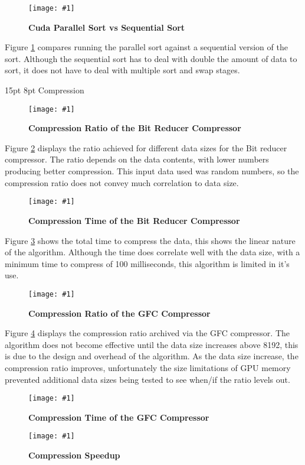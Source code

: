 \documentclass[12pt,a4paper]{article}
\makeatletter
\newcommand{\figuremacroWHHN}[3]{
	\begin{figure}[H] %
		\centering
		\texttt{[image: \#1]}
		\caption[#2]{\textbf{#2}}
		\label{fig:#1}
	\end{figure}
}
\newcommand{\figuremacroWHN}[3]{
	\begin{figure}[h!] %
		\centering
		\texttt{[image: \#1]}
		\caption[#2]{\textbf{#2}}
		\label{fig:#1}
	\end{figure}
}
\renewcommand\subsection{\@startsection {subsection}{1}{2mm} %
                               {15pt} %
                               {8pt} %
                               {\fontsize{13pt}{1em}\bfseries}}
\makeatother
\begin{document}
\figuremacroWHHN
{cudagpusort}
{Cuda Parallel Sort vs Sequential Sort}
{1.0}

Figure \ref{fig:cudagpusort} compares running the parallel sort against a sequential version of the sort. Although the sequential sort has to deal with double the amount of data to sort, 
it does not have to deal with multiple sort and swap stages.
\clearpage

\subsection{Compression}
\figuremacroWHN
{BitCompressRatio}
{Compression Ratio of the Bit Reducer Compressor}
{1.0}

Figure \ref{fig:BitCompressRatio} displays the ratio achieved for different data sizes for the Bit reducer compressor. The ratio depends on the data contents, with lower numbers producing better compression. This input data used was random numbers, so the compression ratio does not convey much correlation to data size.

\figuremacroWHHN
{BitCompressTime}
{Compression Time of the Bit Reducer Compressor}
{1.0}

Figure \ref{fig:BitCompressTime} shows the total time to compress the data, this shows the linear nature of the algorithm. Although the time does correlate well with the data size, with a minimum time to compress of 100 milliseconds, this algorithm is limited in it's use.
\clearpage
\figuremacroWHN
{GFCcompressionRatio}
{Compression Ratio of the GFC Compressor}
{1.0}

Figure \ref{fig:GFCcompressionRatio} displays the compression ratio archived via the GFC compressor. The algorithm does not become effective until the data size increases above 8192, this is due to the design and overhead of the algorithm. As the data size increase, the compression ratio improves, unfortunately the size limitations of GPU memory prevented additional data sizes being tested to see when/if the ratio levels out.

\figuremacroWHN
{GFCCompressionTime}
{Compression Time of the GFC Compressor}
{1.0}

\figuremacroWHN
{GFCCompressionSpeedupvsDataSize}
{Compression Speedup}
{1.0}




%

\end{document}

